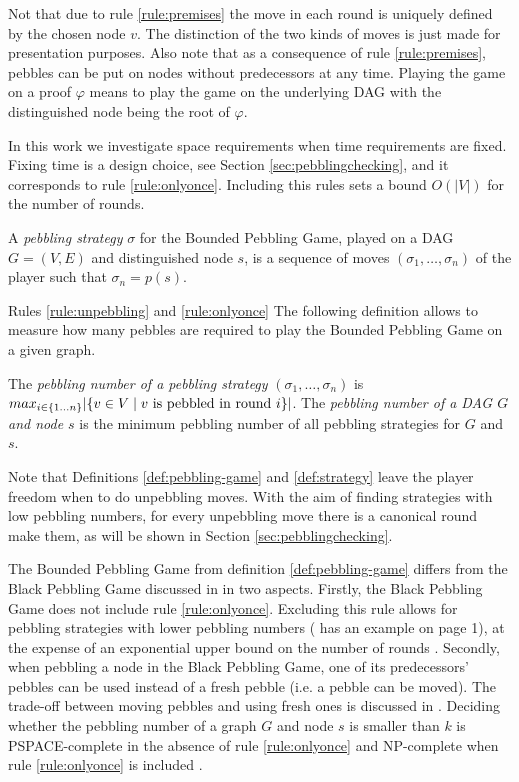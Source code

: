 Not that due to rule \ref{rule:premises} the move in each round is uniquely defined by the chosen node $v$.
The distinction of the two kinds of moves is just made for presentation purposes.
Also note that as a consequence of rule \ref{rule:premises}, pebbles can be put on nodes without predecessors at any time.
Playing the game on a proof $\varphi$ means to play the game on the underlying DAG with the distinguished node being the root of $\varphi$.

In this work we investigate space requirements when time requirements are fixed.
Fixing time is a design choice, see Section \ref{sec:pebblingchecking}, and it corresponds to rule \ref{rule:onlyonce}.
Including this rules sets a bound $O(|V|)$ for the number of rounds.

\begin{definition}[Strategy]
\label{def:strategy}
A \emph{pebbling strategy} $\sigma$ for the Bounded Pebbling Game, played on a DAG $G = (V,E)$ and distinguished node $s$, is a sequence of moves $(\sigma_1,\ldots,\sigma_n)$ of the player such that $\sigma_n = p(s)$.
\end{definition}

Rules \ref{rule:unpebbling} and \ref{rule:onlyonce} 
The following definition allows to measure how many pebbles are required to play the Bounded Pebbling Game on a given graph.

\begin{definition}
The \emph{pebbling number of a pebbling strategy} $(\sigma_1,\ldots,\sigma_n)$ is 
$ max_{i \scriptstyle \in \{1\ldots n\} \displaystyle}|\{ v \in V \mid v \text{ is pebbled in round } i\}| $.
The \emph{pebbling number of a DAG $G$ and node $s$} is the minimum pebbling number of all pebbling strategies for $G$ and $s$.
\end{definition}

Note that Definitions \ref{def:pebbling-game} and \ref{def:strategy} leave the player freedom when to do unpebbling moves.
With the aim of finding strategies with low pebbling numbers, for every unpebbling move there is a canonical round make them, as will be shown in Section \ref{sec:pebblingchecking}.

The Bounded Pebbling Game from definition \ref{def:pebbling-game} differs from the Black Pebbling Game discussed in \cite{Hertel2007,Pippenger1982} in two aspects. 
Firstly, the Black Pebbling Game does not include rule \ref{rule:onlyonce}. 
Excluding this rule allows for pebbling strategies with lower pebbling numbers (\cite{Sethi1975} has an example on page 1), at the expense of an exponential upper bound on the number of rounds \cite{EmdeBoas1979}.
Secondly, when pebbling a node in the Black Pebbling Game, one of its predecessors' pebbles can be used instead of a fresh pebble (i.e. a pebble can be moved). 
The trade-off between moving pebbles and using fresh ones is discussed in \cite{EmdeBoas1979}. 
Deciding whether the pebbling number of a graph $G$ and node $s$ is smaller than $k$ is PSPACE-complete in the absence of rule \ref{rule:onlyonce} \cite{Gilbert1980} and NP-complete when rule \ref{rule:onlyonce} is included \cite{Sethi1975}.

